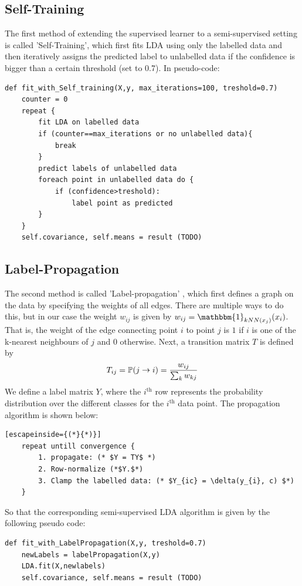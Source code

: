 \documentclass [a4paper] {report}
\begin{document}
	\subsection*{Self-Training}
	The first method of extending the supervised learner to a semi-supervised setting is called 'Self-Training', which first fits LDA using only the labelled data and then iteratively assigns the predicted label to unlabelled data if the confidence is bigger than a certain threshold (set to 0.7). In pseudo-code:
	
	\begin{lstlisting}
def fit_with_Self_training(X,y, max_iterations=100, treshold=0.7)
	counter = 0
	repeat {
		fit LDA on labelled data
		if (counter==max_iterations or no unlabelled data){
			break
		}
		predict labels of unlabelled data
		foreach point in unlabelled data do {
			if (confidence>treshold):
				label point as predicted
		}		
	}
	self.covariance, self.means = result (TODO)
	\end{lstlisting}
	\subsection*{Label-Propagation}
	The second method is called 'Label-propagation' \citep{propagation}, which first defines a graph on the data by specifying the weights of all edges. There are multiple ways to do this, but in our case the weight $w_{ij}$ is given by $w_{ij} = \mathbbm{1}_{kNN(x_{j})}(x_{i})$. That is, the weight of the edge connecting point $i$ to point $j$ is $1$ if $i$ is one of the k-nearest neighbours of $j$ and $0$ otherwise. Next, a transition matrix $T$ is defined by 
	$$T_{ij} = \mathbb{P}(j \to i) = {w_{ij} \over \sum_{k} w_{kj} } $$
	We define a label matrix $Y$, where the $i^{\text{th}}$ row represents the probability distribution over the different classes for the $i^{\text{th}}$ data point. The propagation algorithm is shown below:
	\begin{lstlisting}[escapeinside={(*}{*)}]
	repeat untill convergence {
		1. propagate: (* $Y = TY$ *)
		2. Row-normalize (*$Y.$*)
		3. Clamp the labelled data: (* $Y_{ic} = \delta(y_{i}, c) $*)	
	}
	\end{lstlisting}
	So that the corresponding semi-supervised LDA algorithm is given by the following pseudo code:
	\begin{lstlisting}
def fit_with_LabelPropagation(X,y, treshold=0.7)
	newLabels = labelPropagation(X,y)
	LDA.fit(X,newlabels)
	self.covariance, self.means = result (TODO)
	\end{lstlisting}
	
\end{document}
